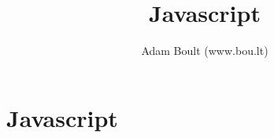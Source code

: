\documentclass[oneside]{book}
\begin{document}
\author{Adam Boult (www.bou.lt)}
\title{Javascript}
\maketitle

\setcounter{tocdepth}{0}
\tableofcontents



\part{Javascript}

\end{document}
